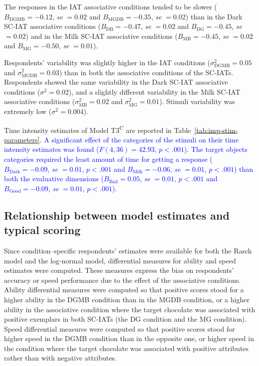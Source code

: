 \documentclass[12pt]{book}
\begin{document}
The responses in the IAT associative conditions tended to be slower ($B_{\text{DGMB}} = -0.12$, \emph{se}  $= 0.02$ and $B_{\text{MGDB}} = -0.35$, \emph{se}  $= 0.02$) than in the Dark SC-IAT associative conditions ($B_{\text{DB}} = -0.47$, \emph{se}  $= 0.02$ and $B_{\text{DG}} = -0.45$, \emph{se}  $= 0.02$) and in the Milk SC-IAT associative conditions ($B_{\text{MB}} = -0.45$, \emph{se}  $= 0.02$ and $B_{\text{MG}} = -0.50$, \emph{se}  $= 0.01$).

Respondents' variability was slightly higher in the IAT conditions ($\sigma_{\text{DGMB}}^ 2 = 0.05$ and $\sigma_{\text{MGDB}}^2 = 0.03$) than in both the associative conditions of the SC-IATs. 
Respondents showed the same variability in the Dark SC-IAT associative conditions ($\sigma^2 = 0.02$), and a slightly different variability in the Milk SC-IAT associative conditions ($\sigma_{\text{MB}}^2 = 0.02$ and $\sigma_{\text{MG}}^2 = 0.01$). 
Stimuli variability was extremely low ($\sigma^2 = 0.004$).

Time intensity estimates of Model T3\textsuperscript{C} are reported in Table~\ref{tab:imp-stim-parameters}.  
\textcolor{blue}{A significant effect of the categories of the stimuli on their time intensity estimates was found ($F(4,36)= 42.93$, $p < .001$). 
	The target objects categories required the least amount of time for getting a response ($B_{\text{Dark}} = -0.09$, \emph{se}  $= 0.01$, $p < .001$ and $B_{\text{Milk}} = -0.06$, \emph{se}  $= 0.01$, $p < .001$) than both the evaluative dimensions  ($B_{\text{Bad}} = 0.05$, \emph{se}  $= 0.01$, $p < .001$ and $B_{\text{Good}} = -0.09$, \emph{se}  $= 0.01$, $p < .001$).
}

\subsection{Relationship between model estimates and typical scoring}

Since condition--specific respondents' estimates were available for both the Rasch model and the log-normal model, differential measures for ability and speed estimates were computed.
These measures express the bias on respondents' accuracy or speed performance due to the effect of the associative conditions. 
Ability differential measures were computed so that positive scores stood for a higher ability in the DGMB condition than in the MGDB condition, or a higher ability in the associative condition where the target chocolate was associated with positive exemplars in both SC-IATs (the DG condition and the MG condition). 
Speed differential measures were computed so that positive scores stood for higher speed in the DGMB condition than in the opposite one, or  higher speed in the condition where the target chocolate was associated with positive attributes rather than with negative attributes.
\end{document}
